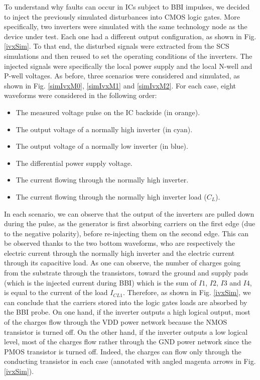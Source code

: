 \documentclass[10pt, conference, compsocconf]{IEEEtran}
\begin{document}
To understand why faults can occur in ICs subject to BBI impulses, we decided to inject the previously simulated disturbances into CMOS logic gates.
More specifically, two inverters were simulated with the same technology node as the device under test.
Each one had a different output configuration, as shown in Fig. \ref{ivxSim}.
To that end, the disturbed signals were extracted from the SCS simulations and then reused to set the operating conditions of the inverters.
The injected signals were specifically the local power supply and the local N-well and P-well voltages.
As before, three scenarios were considered and simulated, as shown in Fig. \ref{simIvxM0}, \ref{simIvxM1} and \ref{simIvxM2}.
For each case, eight waveforms were considered in the following order:
\begin{itemize}
    \item The measured voltage pulse on the IC backside (in orange).
    \item The output voltage of a normally high inverter (in cyan).
    \item The output voltage of a normally low inverter (in blue).
    \item The differential power supply voltage.
    \item The current flowing through the normally high inverter.
    \item The current flowing through the normally high inverter load ($C_L$).
\end{itemize}
In each scenario, we can observe that the output of the inverters are pulled down during the pulse, as the generator is first absorbing carriers on the first edge (due to the negative polarity), before re-injecting them on the second edge.
This can be observed thanks to the two bottom waveforms, who are respectively the electric current through the normally high inverter and the electric current through its capacitive load.
As one can observe, the number of charges going from the substrate through the transistors, toward the ground and supply pads (which is the injected current during BBI) which is the sum of $I1$, $I2$, $I3$ and $I4$, is equal to the current of the load $I_{CL1}$.
Therefore, as shown in Fig. \ref{ivxSim}, we can conclude that the carriers stored into the logic gates loads are absorbed by the BBI probe.
On one hand, if the inverter outputs a high logical output, most of the charges flow through the VDD power network because the NMOS transistor is turned off.
On the other hand, if the inverter outputs a low logical level, most of the charges flow rather through the GND power network since the PMOS transistor is turned off.
Indeed, the charges can flow only through the conducting transistor in each case (annotated with angled magenta arrows in Fig. \ref{ivxSim}).
\end{document}
